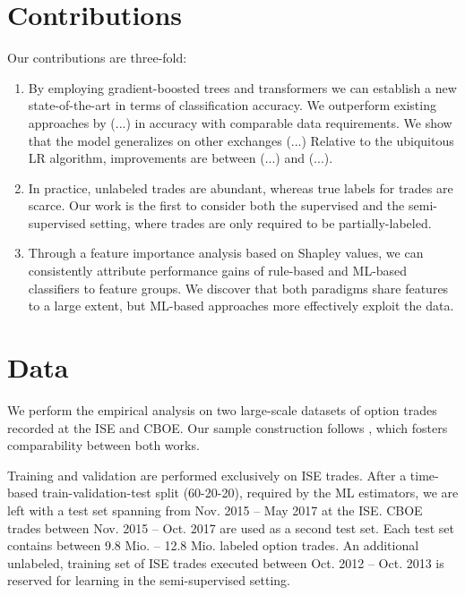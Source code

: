 \section{Contributions}

Our contributions are three-fold: 
\begin{enumerate}[label=(\roman*),noitemsep]

\item By employing gradient-boosted trees and transformers we can establish a new state-of-the-art in terms of classification accuracy. We outperform existing approaches by (...) in accuracy with comparable data requirements. We show that the model generalizes on other exchanges (...) Relative to the ubiquitous \gls{LR} algorithm, improvements are between (...) and (...).
\item In practice, unlabeled trades are abundant, whereas true labels for trades are scarce. Our work is the first to consider both the supervised and the semi-supervised setting, where trades are only required to be partially-labeled.
\item Through a feature importance analysis based on Shapley values, we can consistently attribute performance gains of rule-based and \gls{ML}-based classifiers to feature groups. We discover that both paradigms share features to a large extent, but \gls{ML}-based approaches more effectively exploit the data.
\end{enumerate}

\section{Data}


We perform the empirical analysis on two large-scale datasets of option trades recorded at the \gls{ISE} and \gls{CBOE}. Our sample construction follows \textcite[][]{grauerOptionTradeClassification2022}, which fosters comparability between both works. 

Training and validation are performed exclusively on \gls{ISE} trades. After a time-based train-validation-test split (60-20-20), required by the \gls{ML} estimators, we are left with a test set spanning from Nov. 2015 -- May 2017 at the \gls{ISE}. \gls{CBOE} trades between Nov. 2015 -- Oct. 2017 are used as a second test set. Each test set contains between 9.8 Mio. --  12.8 Mio. labeled option trades. An additional unlabeled, training set of \gls{ISE} trades executed between Oct. 2012 -- Oct. 2013 is reserved for learning in the semi-supervised setting.

